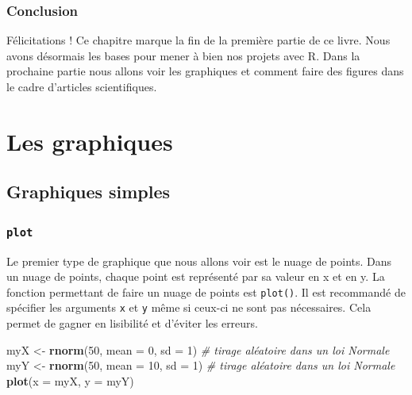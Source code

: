 \documentclass[
]{book}
\newenvironment{Shaded}{\begin{snugshade}}{\end{snugshade}}
\newcommand{\CommentTok}[1]{\textcolor[rgb]{0.56,0.35,0.01}{\textit{#1}}}
\newcommand{\DataTypeTok}[1]{\textcolor[rgb]{0.13,0.29,0.53}{#1}}
\newcommand{\DecValTok}[1]{\textcolor[rgb]{0.00,0.00,0.81}{#1}}
\newcommand{\KeywordTok}[1]{\textcolor[rgb]{0.13,0.29,0.53}{\textbf{#1}}}
\newcommand{\NormalTok}[1]{#1}
\newcommand{\StringTok}[1]{\textcolor[rgb]{0.31,0.60,0.02}{#1}}
\begin{document}
\hypertarget{conclusion-7}{%
\section{Conclusion}\label{conclusion-7}}

Félicitations ! Ce chapitre marque la fin de la première partie de ce livre. Nous avons désormais les bases pour mener à bien nos projets avec R. Dans la prochaine partie nous allons voir les graphiques et comment faire des figures dans le cadre d'articles scientifiques.

\hypertarget{part-les-graphiques}{%
\part{Les graphiques}\label{part-les-graphiques}}

\hypertarget{graph1}{%
\chapter{Graphiques simples}\label{graph1}}

\hypertarget{graph1plot}{%
\section{\texorpdfstring{\texttt{plot}}{plot}}\label{graph1plot}}

Le premier type de graphique que nous allons voir est le nuage de points. Dans un nuage de points, chaque point est représenté par sa valeur en x et en y. La fonction permettant de faire un nuage de points est \texttt{plot()}. Il est recommandé de spécifier les arguments \texttt{x} et \texttt{y} même si ceux-ci ne sont pas nécessaires. Cela permet de gagner en lisibilité et d'éviter les erreurs.

\begin{Shaded}
\begin{Highlighting}[]
\NormalTok{myX <-}\StringTok{ }\KeywordTok{rnorm}\NormalTok{(}\DecValTok{50}\NormalTok{, }\DataTypeTok{mean =} \DecValTok{0}\NormalTok{, }\DataTypeTok{sd =} \DecValTok{1}\NormalTok{) }\CommentTok{# tirage aléatoire dans un loi Normale}
\NormalTok{myY <-}\StringTok{ }\KeywordTok{rnorm}\NormalTok{(}\DecValTok{50}\NormalTok{, }\DataTypeTok{mean =} \DecValTok{10}\NormalTok{, }\DataTypeTok{sd =} \DecValTok{1}\NormalTok{) }\CommentTok{# tirage aléatoire dans un loi Normale}
\KeywordTok{plot}\NormalTok{(}\DataTypeTok{x =}\NormalTok{ myX, }\DataTypeTok{y =}\NormalTok{ myY)}
\end{Highlighting}
\end{Shaded}
\end{document}
